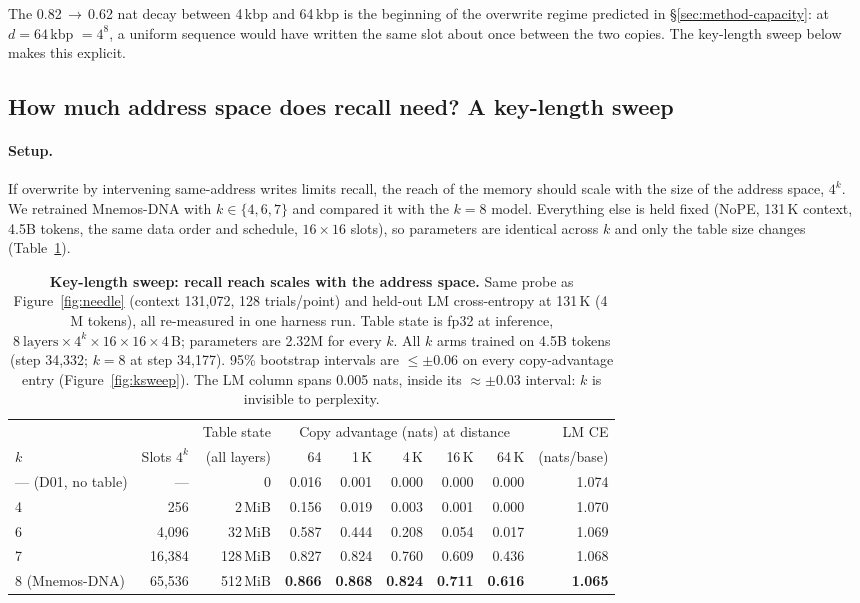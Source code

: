 \documentclass[11pt]{article}
\theoremstyle{plain}
\newcommand{\best}[1]{\textbf{#1}}
\begin{document}
The 0.82\,$\to$\,0.62 nat decay between 4\,kbp and 64\,kbp is the beginning of the overwrite
regime predicted in \S\ref{sec:method-capacity}: at $d{=}64$\,kbp $=4^8$, a uniform sequence would
have written the same slot about once between the two copies. The key-length sweep below makes
this explicit.

\subsection{How much address space does recall need? A key-length sweep}\label{sec:exp-ksweep}

\paragraph{Setup.} If overwrite by intervening same-address writes limits recall, the reach of
the memory should scale with the size of the address space, $4^k$. We retrained Mnemos-DNA with
$k\in\{4,6,7\}$ and compared it with the $k{=}8$ model. Everything else is held fixed (NoPE,
131\,K context, 4.5B tokens, the same data order and schedule, $16\times16$ slots), so parameters
are identical across $k$ and only the table size changes
(Table~\ref{tab:ksweep}).

\begin{table}[!tbp]
\centering\small
\begin{tabular}{lrrrrrrrr}
\toprule
& & Table state & \multicolumn{5}{c}{Copy advantage (nats) at distance} & LM CE \\
\cmidrule(lr){4-8}
$k$ & Slots $4^k$ & (all layers) & 64 & 1\,K & 4\,K & 16\,K & 64\,K & (nats/base) \\
\midrule
--- (D01, no table) & --- & 0 & 0.016 & 0.001 & 0.000 & 0.000 & 0.000 & 1.074 \\
4 & 256    & 2\,MiB   & 0.156 & 0.019 & 0.003 & 0.001 & 0.000 & 1.070 \\
6 & 4{,}096  & 32\,MiB  & 0.587 & 0.444 & 0.208 & 0.054 & 0.017 & 1.069 \\
7 & 16{,}384 & 128\,MiB & 0.827 & 0.824 & 0.760 & 0.609 & 0.436 & 1.068 \\
8 (Mnemos-DNA) & 65{,}536 & 512\,MiB & \best{0.866} & \best{0.868} & \best{0.824} & \best{0.711} & \best{0.616} & \best{1.065} \\
\bottomrule
\end{tabular}
\caption{\textbf{Key-length sweep: recall reach scales with the address space.} Same probe as
Figure~\ref{fig:needle} (context 131{,}072, 128 trials/point) and held-out LM cross-entropy at
131\,K (4\,M tokens), all re-measured in one harness run. Table state is fp32 at inference,
$8\ \text{layers}\times4^k\times16{\times}16\times4$\,B; parameters are 2.32M for every $k$. All
$k$ arms trained on 4.5B tokens (step 34{,}332; $k{=}8$ at step 34{,}177). 95\% bootstrap intervals
are $\le\pm0.06$ on every copy-advantage entry (Figure~\ref{fig:ksweep}). The LM column spans 0.005
nats, inside its $\approx\pm0.03$ interval: $k$ is invisible to perplexity.}
\label{tab:ksweep}
\end{table}
\end{document}
